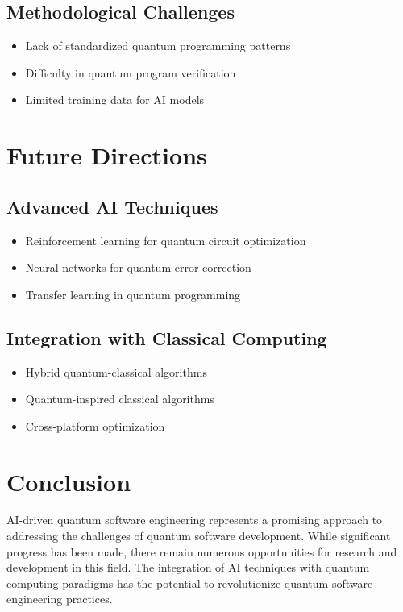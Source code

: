 \documentclass[10pt,twocolumn]{article}
\begin{document}
\subsection{Methodological Challenges}
\begin{itemize}[leftmargin=*]
    \item Lack of standardized quantum programming patterns
    \item Difficulty in quantum program verification
    \item Limited training data for AI models
\end{itemize}

\section{Future Directions}
\subsection{Advanced AI Techniques}
\begin{itemize}[leftmargin=*]
    \item Reinforcement learning for quantum circuit optimization
    \item Neural networks for quantum error correction
    \item Transfer learning in quantum programming
\end{itemize}

\subsection{Integration with Classical Computing}
\begin{itemize}[leftmargin=*]
    \item Hybrid quantum-classical algorithms
    \item Quantum-inspired classical algorithms
    \item Cross-platform optimization
\end{itemize}

\section{Conclusion}
AI-driven quantum software engineering represents a promising approach to addressing the challenges of quantum software development. While significant progress has been made, there remain numerous opportunities for research and development in this field. The integration of AI techniques with quantum computing paradigms has the potential to revolutionize quantum software engineering practices.
\end{document}
